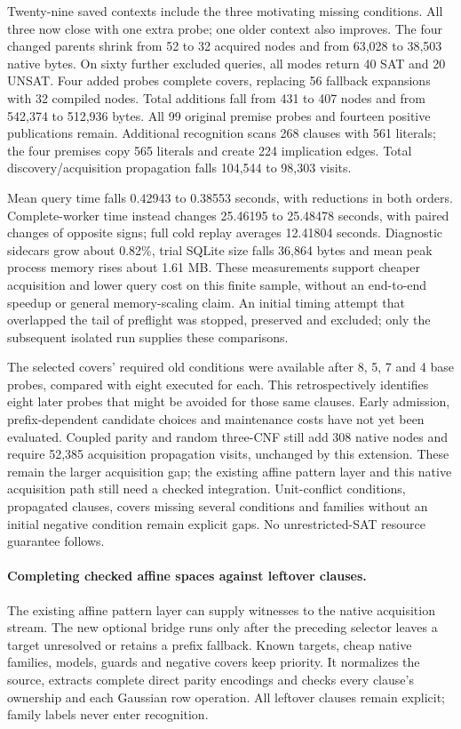 \documentclass[11pt,a4paper]{article}
\numberwithin{equation}{section}
\theoremstyle{plain}
\theoremstyle{definition}
\theoremstyle{remark}
\begin{document}
Twenty-nine saved contexts include the three motivating missing conditions.
All three now close with one extra probe; one older context also improves.
The four changed parents shrink from 52 to 32 acquired nodes and from 63,028
to 38,503 native bytes. On sixty further excluded queries, all modes return
40 SAT and 20 UNSAT. Four added probes complete covers, replacing 56 fallback
expansions with 32 compiled nodes. Total additions fall from 431 to 407 nodes
and from 542,374 to 512,936 bytes. All 99 original premise probes and fourteen
positive publications remain. Additional recognition scans 268 clauses with
561 literals; the four premises copy 565 literals and create 224 implication
edges. Total discovery/acquisition propagation falls 104,544 to 98,303 visits.

Mean query time falls 0.42943 to 0.38553 seconds, with reductions in both
orders. Complete-worker time instead changes 25.46195 to 25.48478 seconds,
with paired changes of opposite signs; full cold replay averages 12.41804
seconds. Diagnostic sidecars grow about 0.82\%, trial SQLite size falls 36,864
bytes and mean peak process memory rises about 1.61 MB. These measurements
support cheaper acquisition and lower query cost on this finite sample, without
an end-to-end speedup or general memory-scaling claim. An initial timing attempt
that overlapped the tail of preflight was stopped, preserved and excluded;
only the subsequent isolated run supplies these comparisons.

The selected covers' required old conditions were available after 8, 5, 7 and
4 base probes, compared with eight executed for each. This retrospectively
identifies eight later probes that might be avoided for those same clauses.
Early admission, prefix-dependent candidate choices and maintenance costs have
not yet been evaluated.
Coupled parity and random three-CNF still add 308 native nodes and require
52,385 acquisition propagation visits, unchanged by this extension.
These remain the larger acquisition gap; the existing affine pattern layer
and this native acquisition path still need a checked integration. Unit-conflict conditions, propagated clauses, covers
missing several conditions and families without an initial negative condition
remain explicit gaps. No unrestricted-SAT resource guarantee follows.

\paragraph{Completing checked affine spaces against leftover clauses.}
The existing affine pattern layer can supply witnesses to the native acquisition
stream. The new optional bridge runs only after the preceding selector leaves
a target unresolved or retains a prefix fallback. Known targets, cheap native
families, models, guards and negative covers keep priority. It normalizes the
source, extracts complete direct parity encodings and checks every clause's
ownership and each Gaussian row operation. All leftover clauses remain explicit;
family labels never enter recognition.
\end{document}
